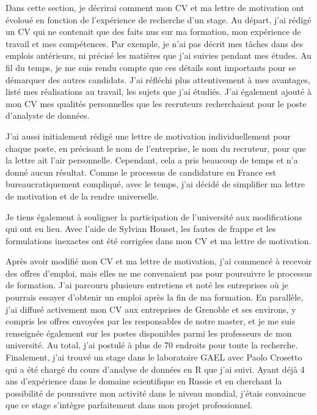 \documentclass[12pt]{article}
\begin{document}
Dans cette section, je décrirai comment mon CV et ma lettre de
motivation ont évoloué en fonction de l'expérience de recherche d'un
stage. Au départ, j'ai rédigé un CV qui ne contenait que des faits nus
sur ma formation, mon expérience de travail et mes compétences. Par
exemple, je n'ai pas décrit mes tâches dans des emplois antérieurs, ni
précisé les matières que j'ai suivies pendant mes études. Au fil du
temps, je me suis rendu compte que ces détails sont importants pour se
démarquer des autres candidats. J'ai réfléchi plus attentivement à mes
avantages, listé mes réalisations au travail, les sujets que j'ai
étudiés. J'ai également ajouté à mon CV mes qualités personnelles que
les recruteurs recherchaient pour le poste d'analyste de données.

J'ai aussi initialement rédigé une lettre de motivation individuellement
pour chaque poste, en précisant le nom de l'entreprise, le nom du
recruteur, pour que la lettre ait l'air personnelle. Cependant, cela a
pris beaucoup de temps et n'a donné aucun résultat. Comme le processus
de candidature en France est bureaucratiquement compliqué, avec le
temps, j'ai décidé de simplifier ma lettre de motivation et de la rendre
universelle.

Je tiens également à souligner la participation de l'université aux
modifications qui ont eu lieu. Avec l'aide de Sylvian Houset, les fautes
de frappe et les formulations inexactes ont été corrigées dans mon CV et
ma lettre de motivation.

Après avoir modifié mon CV et ma lettre de motivation, j'ai commencé à
recevoir des offres d'emploi, mais elles ne me convenaient pas pour
poursuivre le processus de formation. J'ai parcouru plusieurs entretiens
et noté les entreprises où je pourrais essayer d'obtenir un emploi après
la fin de ma formation. En parallèle, j'ai diffusé activement mon CV aux
entreprises de Grenoble et ses environs, y compris les offres envoyées
par les responsables de notre master, et je me suis renseignée également
sur les postes disponibles parmi les professeurs de mon université. Au
total, j'ai postulé à plus de 70 endroits pour toute la recherche.
Finalement, j'ai trouvé un stage dans le laboratoire GAEL avec Paolo
Crosetto qui a été chargé du cours d'analyse de données en R que j'ai
suivi. Ayant déjà 4 ans d'expérience dans le domaine scientifique en
Russie et en cherchant la possibilité de poursuivre mon activité dans le
niveau mondial, j'étais convaincue que ce stage s'intègre parfaitement
dans mon projet professionnel.
\end{document}
